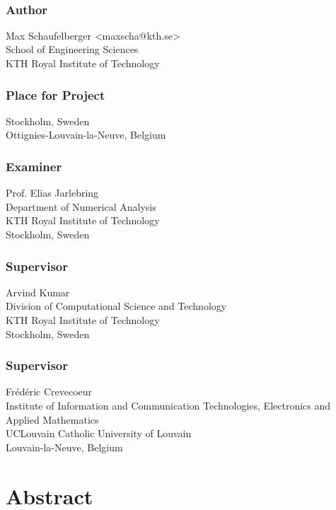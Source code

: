 \newpage
\thispagestyle{plain}
~\\
\vfill
{ 
	\subsection*{Author}
	Max Schaufelberger <maxscha@kth.se>\\
	School of Engineering Sciences\\
	KTH Royal Institute of Technology

	\subsection*{Place for Project}
	Stockholm, Sweden\\
	Ottignies-Louvain-la-Neuve, Belgium

	\subsection*{Examiner }
	Prof. Elias Jarlebring\\
	Department of Numerical Analysis\\
	KTH Royal Institute of Technology\\
	Stockholm, Sweden
	~
	\subsection*{Supervisor }
	Arvind Kumar\\
	Division of Computational Science and Technology\\
	KTH Royal Institute of Technology\\
	Stockholm, Sweden
	~
	\subsection*{Supervisor }
	Frédéric Crevecoeur\\
	Institute of Information and Communication Technologies, Electronics and Applied Mathematics\\
	UCLouvain Catholic University of Louvain\\
	Louvain-la-Neuve, Belgium
	~


}


\newpage
\thispagestyle{plain}
\chapter*{Abstract}

